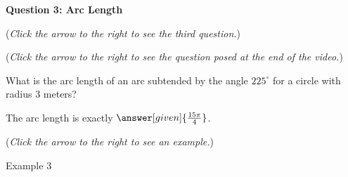 \documentclass{ximera}
\begin{document}
\textbf{Question 3: Arc Length}
\begin{question}
\begin{flushright}
{\color{blue}(\emph{Click the arrow to the right to see the third question.})}
\end{flushright}
\begin{center}
\begin{expandable}
{\color{blue}(\emph{Click the arrow to the right to see the question
posed at the end of the video.})}
\begin{expandable}
What is the arc length of an arc subtended by the angle $225^\circ$
for a circle with radius $3$ meters?\\
\begin{prompt}
The arc length is exactly $\answer[given]{\frac{15\pi}{4}}$.
\end{prompt}
\begin{flushright}
{\color{blue}(\emph{Click the arrow to the right to see an example.})}
\end{flushright}
\begin{expandable}
Example 3
\end{expandable}
\end{expandable}
\end{expandable}
\end{center}
\end{question}
\end{document}
